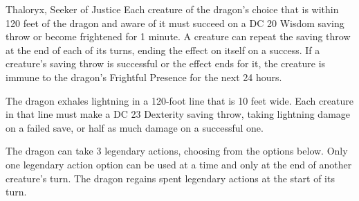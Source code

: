 \begin{DndMonster}[width=0.5\textwidth]{Thaloryx, Seeker of Justice}
	Each creature of the dragon's choice that is within 120 feet of the dragon and aware of it must succeed on a DC 20 Wisdom saving throw or become frightened for 1 minute. A creature can repeat the saving throw at the end of each of its turns, ending the effect on itself on a success. If a creature's saving throw is successful or the effect ends for it, the creature is immune to the dragon's Frightful Presence for the next 24 hours.
	
	The dragon exhales lightning in a 120-­foot line that is 10 feet wide. Each creature in that line must make a DC 23 Dexterity saving throw, taking  lightning damage on a failed save, or half as much damage on a successful one.
	
	The dragon can take 3 legendary actions, choosing from the options below. Only one legendary action option can be used at a time and only at the end of another creature's turn. The dragon regains spent legendary actions at the start of its turn.
	\begin{DndMonsterLegendaryActions}
	\end{DndMonsterLegendaryActions}
\end{DndMonster}